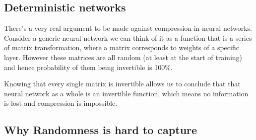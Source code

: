 \subsection{Deterministic networks} \label{ssection:detnet}

There's a very real argument to be made against compression in neural networks.
Consider a generic neural network we can think of it as a function that is a
series of matrix transformation, where a matrix corresponds to weights of a
specific layer. However these matrices are all random (at least at the start of
training) and hence probability of them being invertible is 100\%. 

Knowing that every single matrix is invertible allows us to conclude that that
neural network as a whole is an invertible function, which means no information
is lost and compression is impossible.



\subsection{Why Randomness is hard to capture} \label{ssection:rename}


